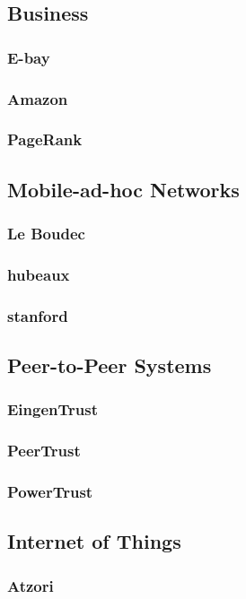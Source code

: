 \subsection{Business}

\subsubsection{E-bay}

\subsubsection{Amazon}

\subsubsection{PageRank}

\subsection{Mobile-ad-hoc Networks}

\subsubsection{Le Boudec}

\subsubsection{hubeaux}

\subsubsection{stanford}

\subsection{Peer-to-Peer Systems}

\subsubsection{EingenTrust}

\subsubsection{PeerTrust}

\subsubsection{PowerTrust}
\newpage
\subsection{Internet of Things}

\subsubsection{Atzori}


